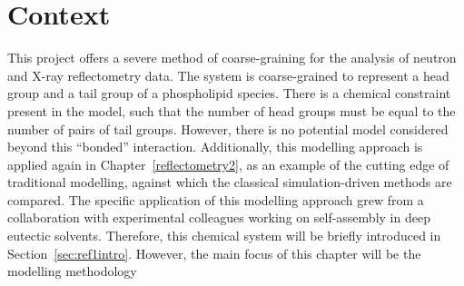\section*{Context}
This project offers a severe method of coarse-graining for the analysis of neutron and X-ray reflectometry data.
The system is coarse-grained to represent a head group and a tail group of a phospholipid species.
There is a chemical constraint present in the model, such that the number of head groups must be equal to the number of pairs of tail groups.
However, there is no potential model considered beyond this ``bonded'' interaction.
Additionally, this modelling approach is applied again in Chapter~\ref{reflectometry2}, as an example of the cutting edge of traditional modelling, against which the classical simulation-driven methods are compared.
The specific application of this modelling approach grew from a collaboration with experimental colleagues working on self-assembly in deep eutectic solvents.
Therefore, this chemical system will be briefly introduced in Section~\ref{sec:ref1intro}.
However, the main focus of this chapter will be the modelling methodology
